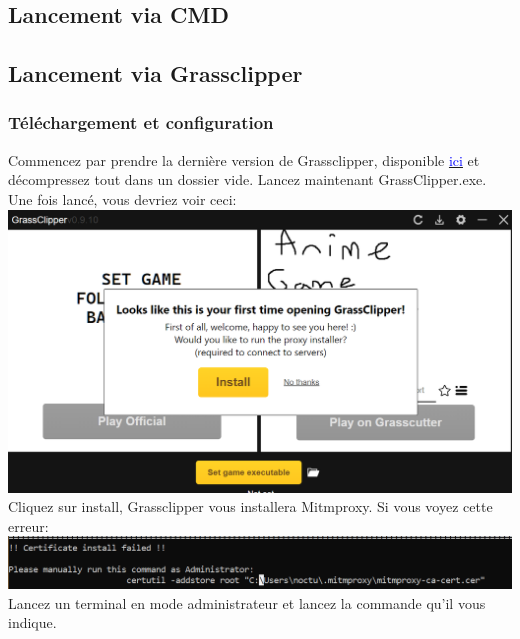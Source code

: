 \documentclass{article}
\begin{document}
\subsection{Lancement via CMD}

\subsection{Lancement via Grassclipper}

\subsubsection{Téléchargement et configuration}
Commencez par prendre la dernière version de Grassclipper, disponible \href{https://github.com/Grasscutters/GrassClipper/releases}{\textcolor{blue}{ici}} et décompressez tout dans un dossier vide.\newline
Lancez maintenant GrassClipper.exe.\newline
Une fois lancé, vous devriez voir ceci:\newline
\includegraphics[scale=0.5]{img/first_grassclipper_use.png}\newline
Cliquez sur install, Grassclipper vous installera Mitmproxy.\newline
Si vous voyez cette erreur:\newline
\includegraphics[scale=0.5]{img/error_cert.png}\newline
Lancez un terminal en mode administrateur et lancez la commande qu'il vous indique.
\newline\newline
\end{document}
